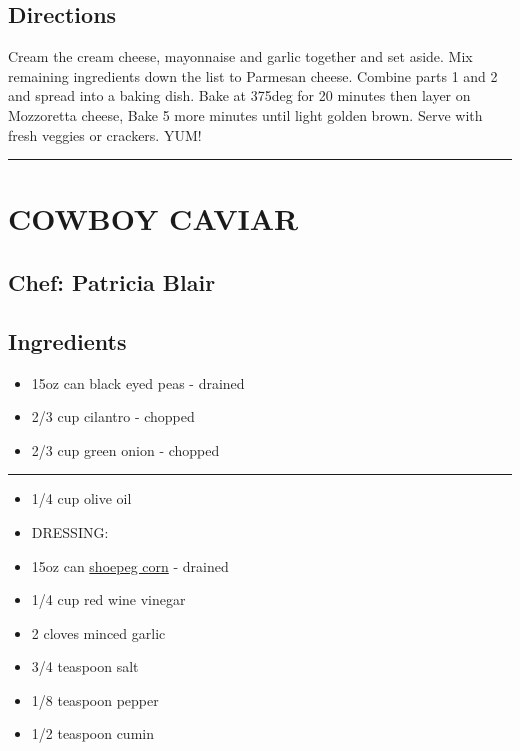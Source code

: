 \documentclass[
]{book}
\providecommand{\tightlist}{%
  \setlength{\itemsep}{0pt}\setlength{\parskip}{0pt}}
\begin{document}
\hypertarget{directions}{%
\subsection*{Directions}\label{directions}}

Cream the cream cheese, mayonnaise and garlic together and set aside.
Mix remaining ingredients down the list to Parmesan cheese.
Combine parts 1 and 2 and spread into a baking dish.
Bake at 375deg for 20 minutes then layer on Mozzoretta cheese,
Bake 5 more minutes until light golden brown.
Serve with fresh veggies or crackers.
YUM!

\begin{center}\rule{0.5\linewidth}{0.5pt}\end{center}

\hypertarget{cowboy-caviar}{%
\section*{COWBOY CAVIAR}\label{cowboy-caviar}}

\hypertarget{chef-patricia-blair}{%
\subsection*{Chef: Patricia Blair}\label{chef-patricia-blair}}

\hypertarget{ingredients-1}{%
\subsection*{Ingredients}\label{ingredients-1}}

\begin{itemize}
\tightlist
\item
  15oz can black eyed peas - drained
\item
  2/3 cup cilantro - chopped
\item
  2/3 cup green onion - chopped
\end{itemize}

\begin{center}\rule{0.5\linewidth}{0.5pt}\end{center}

\begin{itemize}
\tightlist
\item
  1/4 cup olive oil
\item
  DRESSING:
\item
  15oz can \href{https://en.wikipedia.org/wiki/Shoepeg_corn}{shoepeg corn} - drained
\item
  1/4 cup red wine vinegar
\item
  2 cloves minced garlic
\item
  3/4 teaspoon salt
\item
  1/8 teaspoon pepper
\item
  1/2 teaspoon cumin
\end{itemize}
\end{document}
